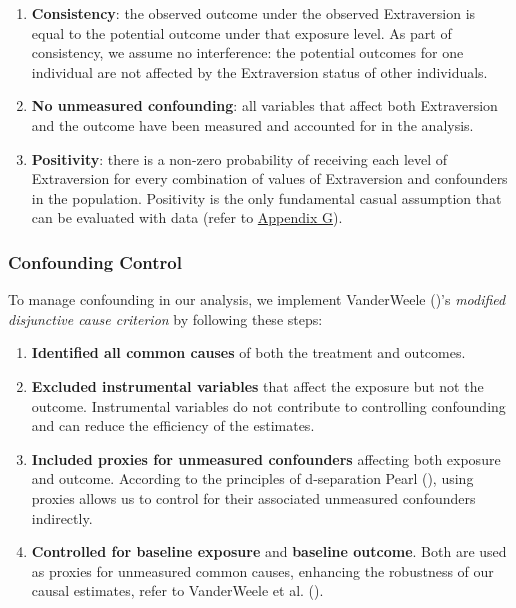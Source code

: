 \documentclass[
  single column]{article}
\providecommand{\tightlist}{%
  \setlength{\itemsep}{0pt}\setlength{\parskip}{0pt}}
\begin{document}
\begin{enumerate}
\def\labelenumi{\arabic{enumi}.}
\item
  \textbf{Consistency}: the observed outcome under the observed
  Extraversion is equal to the potential outcome under that exposure
  level. As part of consistency, we assume no interference: the
  potential outcomes for one individual are not affected by the
  Extraversion status of other individuals.
\item
  \textbf{No unmeasured confounding}: all variables that affect both
  Extraversion and the outcome have been measured and accounted for in
  the analysis.
\item
  \textbf{Positivity}: there is a non-zero probability of receiving each
  level of Extraversion for every combination of values of Extraversion
  and confounders in the population. Positivity is the only fundamental
  casual assumption that can be evaluated with data (refer to
  \hyperref[appendix-positivity]{Appendix G}).
\end{enumerate}

\subsubsection{Confounding Control}\label{confounding-control}

To manage confounding in our analysis, we implement VanderWeele
()'s \emph{modified disjunctive
cause criterion} by following these steps:

\begin{enumerate}
\def\labelenumi{\arabic{enumi}.}
\tightlist
\item
  \textbf{Identified all common causes} of both the treatment and
  outcomes.
\item
  \textbf{Excluded instrumental variables} that affect the exposure but
  not the outcome. Instrumental variables do not contribute to
  controlling confounding and can reduce the efficiency of the
  estimates.
\item
  \textbf{Included proxies for unmeasured confounders} affecting both
  exposure and outcome. According to the principles of d-separation
  Pearl (), using proxies allows us to
  control for their associated unmeasured confounders indirectly.
\item
  \textbf{Controlled for baseline exposure} and \textbf{baseline
  outcome}. Both are used as proxies for unmeasured common causes,
  enhancing the robustness of our causal estimates, refer to VanderWeele
  et al. ().
\end{enumerate}
\end{document}
